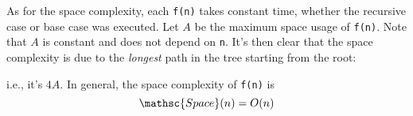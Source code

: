 As for the space complexity,
each \verb!f(n)! takes constant time,
whether the recursive case or base case was executed.
Let $A$ be the maximum space usage of \verb!f(n)!.
Note that $A$ is constant and does not depend on \verb!n!.
It's then clear that the space complexity is due to the
\textit{longest} path in the tree starting from the root:

i.e., it's $4A$.
In general, the space complexity of \verb!f(n)! is
\[
\mathsc{Space}(n) = O(n)
\]



